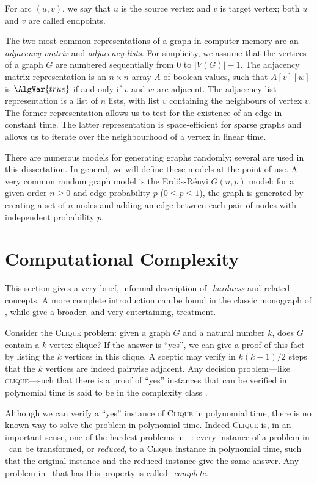 For arc $(u,v)$, we say that $u$ is the source vertex and $v$ is target vertex; both
$u$ and $v$ are called endpoints.

The two most common representations of a graph in computer memory
are an \emph{adjacency matrix} and \emph{adjacency lists}.  For simplicity,
we assume that the vertices of a graph $G$ are numbered sequentially from
0 to $|V(G)| - 1$. The adjacency matrix representation is an $n \times n$
array $A$ of boolean values, such that $A[v][w]$ is $\AlgVar{true}$ if and
only if $v$ and $w$ are adjacent.  The adjacency list representation
is a list of $n$ lists, with list $v$ containing the neighbours of vertex $v$.
The former representation allows us to test for the existence of an edge in constant
time.  The latter representation is space-efficient for sparse graphs
and allows us to iterate over the neighbourhood of a vertex in linear time.

There are numerous models for generating graphs randomly; several are used
in this dissertation. In general, we will define these models at the point
of use.  A very common random graph model is the Erd\H{o}s-Rényi $G(n,p)$
model: for a given order $n \geq 0$ and edge probability $p$ ($0 \leq p \leq 1$),
the graph is generated by creating a set of $n$ nodes and adding an edge
between each pair of nodes with independent probability $p$.

\section{Computational Complexity}\label{sec:complexity}

This section gives a very brief, informal description of
\emph{\NP-hardness} and related concepts. A more complete introduction can be
found in the classic monograph of \citet{DBLP:books/fm/GareyJ79},
while \citet{moore2011nature} give a broader, and very entertaining,
treatment.

Consider the \textsc{Clique} problem: given a graph $G$ and a natural number $k$,
does $G$ contain a $k$-vertex clique?  If the answer is ``yes'', we can give a proof
of this fact by listing the $k$ vertices in this clique.  A sceptic may verify
in $k(k-1)/2$ steps that the $k$ vertices are indeed pairwise adjacent.  Any decision
problem---like \textsc{clique}---such that there is a proof of ``yes'' instances
that can be verified in polynomial time is said to be in the complexity class \NP.

Although we can verify a ``yes'' instance of \textsc{Clique} in polynomial
time, there is no known way to solve the problem in polynomial time.
Indeed \textsc{Clique} is, in an important sense, one of the hardest problems in \NP\
\citep{DBLP:conf/coco/Karp72}: every instance of a problem in \NP\ can be
transformed, or \emph{reduced}, to a \textsc{Clique} instance in polynomial
time, such that the original instance and the reduced instance give the same
answer.  Any problem in \NP\ that has this property is called \emph{\NP-complete}.

